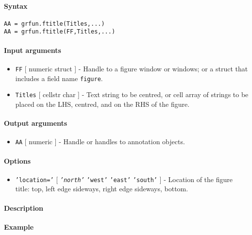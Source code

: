 


	\paragraph{Syntax}

\begin{verbatim}
AA = grfun.ftitle(Titles,...)
AA = grfun.ftitle(FF,Titles,...)
\end{verbatim}

\paragraph{Input arguments}

\begin{itemize}
\item
  \texttt{FF} {[} numeric \textbar{} struct {]} - Handle to a figure
  window or windows; or a struct that includes a field name
  \texttt{figure}.
\item
  \texttt{Titles} {[} cellstr \textbar{} char {]} - Text string to be
  centred, or cell array of strings to be placed on the LHS, centred,
  and on the RHS of the figure.
\end{itemize}

\paragraph{Output arguments}

\begin{itemize}
\itemsep1pt\parskip0pt
\item
  \texttt{AA} {[} numeric {]} - Handle or handles to annotation objects.
\end{itemize}

\paragraph{Options}

\begin{itemize}
\itemsep1pt\parskip0pt
\item
  \texttt{'location='} {[} \emph{\texttt{'north'}} \textbar{}
  \texttt{'west'} \textbar{} \texttt{'east'} \textbar{} \texttt{'south'}
  {]} - Location of the figure title: top, left edge sideways, right
  edge sideways, bottom.
\end{itemize}

\paragraph{Description}

\paragraph{Example}


